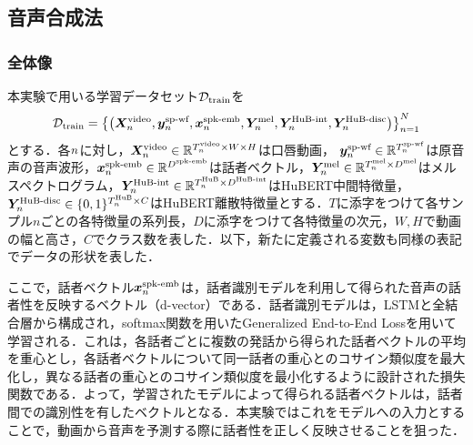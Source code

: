 \subsection{音声合成法}
\subsubsection{全体像}
本実験で用いる学習データセット$\mathcal{D}_{\text{train}}$を
\begin{equation}
    \mathcal{D}_{\text{train}} = \left\{\left(\bm{X}^{\text{video}}_{n}, \bm{y}^{\text{sp-wf}}_{n}, \bm{x}^{\text{spk-emb}}_{n}, \bm{Y}^{\text{mel}}_{n}, \bm{Y}^{\text{HuB-int}}_{n}, \bm{Y}^{\text{HuB-disc}}_{n}\right)\right\}_{n = 1}^{N}
\end{equation}
とする．各$n$に対し，$\bm{X}^{\text{video}}_{n} \in \mathbb{R}^{T^{\text{video}}_{n} \times W \times H}$は口唇動画， $\bm{y}^{\text{sp-wf}}_{n} \in \mathbb{R}^{T^{\text{sp-wf}}_{n}}$は原音声の音声波形，$\bm{x}^{\text{spk-emb}}_{n} \in \mathbb{R}^{D^{\text{spk-emb}}}$は話者ベクトル，$\bm{Y}^{\text{mel}}_{n} \in \mathbb{R}^{T^{\text{mel}}_{n} \times D^{\text{mel}}}$はメルスペクトログラム，$\bm{Y}^{\text{HuB-int}}_{n} \in \mathbb{R}^{T^{\text{HuB}}_{n} \times D^{\text{HuB-int}}}$はHuBERT中間特徴量，$\bm{Y}^{\text{HuB-disc}}_{n} \in \{0, 1\}^{T^{\text{HuB}}_{n} \times C}$はHuBERT離散特徴量とする．$T$に添字をつけて各サンプル$n$ごとの各特徴量の系列長，$D$に添字をつけて各特徴量の次元，$W, H$で動画の幅と高さ，$C$でクラス数を表した．以下，新たに定義される変数も同様の表記でデータの形状を表した．

ここで，話者ベクトル$\bm{x}^{\text{spk-emb}}_{n}$は，話者識別モデル\cite{wan2018generalized}を利用して得られた音声の話者性を反映するベクトル（d-vector）である．話者識別モデルは，LSTMと全結合層から構成され，softmax関数を用いたGeneralized End-to-End Lossを用いて学習される．これは，各話者ごとに複数の発話から得られた話者ベクトルの平均を重心とし，各話者ベクトルについて同一話者の重心とのコサイン類似度を最大化し，異なる話者の重心とのコサイン類似度を最小化するように設計された損失関数である．よって，学習されたモデルによって得られる話者ベクトルは，話者間での識別性を有したベクトルとなる．本実験ではこれをモデルへの入力とすることで，動画から音声を予測する際に話者性を正しく反映させることを狙った．

